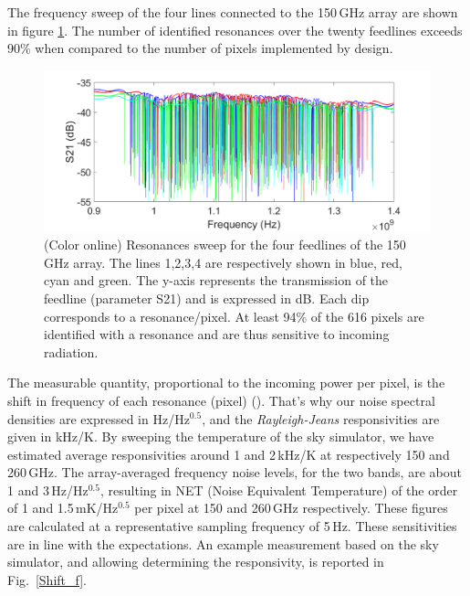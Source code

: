 \documentclass[]{aa} %
\begin{document}
The frequency sweep of the four lines connected to the 150\,GHz array are shown in figure \ref{VNA}. The number of identified resonances over the twenty feedlines exceeds 90\% when compared to the number of pixels implemented by design. 

\begin{figure}[h]
\begin{center}
   \centering
    \includegraphics[width=1.0\linewidth]{VNA_scans_150GHz.png}
    \caption{(Color online) Resonances sweep for the four feedlines of the 150\,GHz array. The lines 1,2,3,4 are respectively shown in blue, red, cyan and green. The y-axis represents the transmission of the feedline (parameter S21) and is expressed in dB. Each dip corresponds to a resonance/pixel. At least 94\% of the 616 pixels are identified with a resonance and are thus sensitive to incoming radiation.}
         \label{VNA}
\end{center}
\end{figure}

The measurable quantity, proportional to the incoming power per pixel, is the shift in frequency of each resonance (pixel) (\cite{Swenson2010}). That's why our noise spectral densities are expressed in Hz/Hz$^{0.5}$, and the \textit{Rayleigh-Jeans} responsivities are given in kHz/K. By sweeping the temperature of the sky simulator, we have estimated average responsivities around 1 and 2\,kHz/K at respectively 150 and 260\,GHz. The array-averaged frequency noise levels, for the two bands, are about 1 and 3\,Hz/Hz$^{0.5}$, resulting in NET (Noise Equivalent Temperature) of the order of 1 and 1.5\,mK/Hz$^{0.5}$ per pixel at 150 and 260\,GHz respectively. These figures are calculated at a representative sampling frequency of 5\,Hz. 
These sensitivities are in line with the expectations. An example measurement based on the sky simulator, and allowing determining the responsivity, is reported in Fig.~\ref{Shift_f}. 
\end{document}
